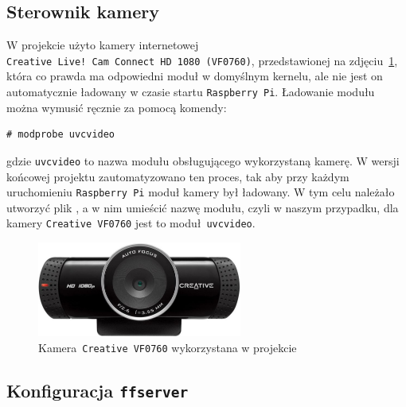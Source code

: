 \documentclass{article}
\begin{document}

\subsection{Sterownik kamery}

W projekcie użyto kamery internetowej \texttt{Creative~Live!~Cam~Connect~HD~1080~(VF0760)}, przedstawionej na zdjęciu~\ref{fig:creative}, która co prawda ma odpowiedni moduł w domyślnym kernelu, ale nie jest on automatycznie ładowany w czasie startu \texttt{Raspberry~Pi}. Ładowanie modułu można wymusić ręcznie za pomocą komendy:
\begin{verbatim}
# modprobe uvcvideo
\end{verbatim}
gdzie \texttt{uvcvideo} to nazwa modułu obsługującego wykorzystaną kamerę. W wersji końcowej projektu zautomatyzowano ten proces, tak aby przy każdym uruchomieniu \texttt{Raspberry~Pi} moduł kamery był ładowany. W tym celu należało utworzyć plik , a w nim umieścić nazwę modułu, czyli w naszym przypadku, dla kamery \texttt{Creative~VF0760} jest to moduł~\texttt{uvcvideo}.
\begin{figure}[h]
	\renewcommand\figurename{Zdjęcie}
	\centering
	\includegraphics[width=0.6\textwidth]{img/creative}
	\caption{Kamera~\texttt{Creative~VF0760} wykorzystana w projekcie}
	\label{fig:creative}
\end{figure}


\subsection{Konfiguracja \texttt{ffserver}}
\end{document}
